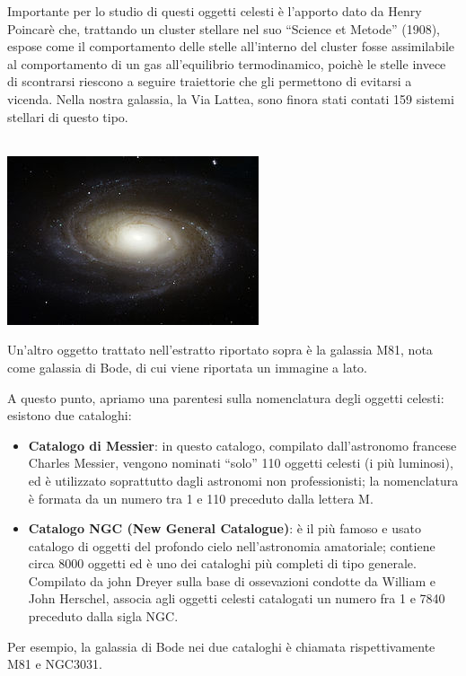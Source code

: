 Importante per lo studio di questi oggetti celesti è l'apporto dato da Henry Poincarè che, trattando un cluster stellare nel suo ``Science et Metode'' (1908), espose come il comportamento delle stelle all'interno del cluster fosse assimilabile al comportamento di un gas all'equilibrio termodinamico, poichè le stelle invece di scontrarsi riescono a seguire traiettorie che gli permettono di evitarsi a vicenda. Nella nostra galassia, la Via Lattea, sono finora stati contati 159 sistemi stellari di questo tipo.\\
\\
\begin{minipage}{.40\textwidth}
	\centering
	\includegraphics[width=.70\textwidth]{Img/M81_bis.jpg}
\end{minipage}
\begin{minipage}{.50\textwidth}
	Un'altro oggetto trattato nell'estratto riportato sopra è la galassia M81, nota come galassia di Bode, di cui viene riportata un immagine a lato.
\end{minipage}

\vspace{0.5cm}

A questo punto, apriamo una parentesi sulla nomenclatura degli oggetti celesti: esistono due cataloghi:
\begin{itemize}
	\item \textbf{Catalogo di Messier}: in questo catalogo, compilato dall'astronomo francese Charles Messier, vengono nominati ``solo'' 110 oggetti celesti (i più luminosi), ed è utilizzato soprattutto dagli astronomi non professionisti; la nomenclatura è formata da un numero tra 1 e 110 preceduto dalla lettera M.
	\item \textbf{Catalogo NGC (New General Catalogue)}: è il più famoso e usato catalogo di oggetti del profondo cielo nell'astronomia amatoriale; contiene circa 8000 oggetti ed è uno dei cataloghi più completi di tipo generale. Compilato da john Dreyer sulla base di ossevazioni condotte da William e John Herschel, associa agli oggetti celesti catalogati un numero fra 1 e 7840 preceduto dalla sigla NGC.
\end{itemize}
Per esempio, la galassia di Bode nei due cataloghi è chiamata rispettivamente M81 e NGC3031.

